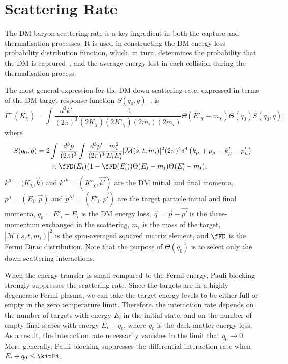 \section{Scattering Rate}
\label{sec:intratetext}
The DM-baryon scattering rate is a key ingredient in both the capture and thermalisation processes. 
It is used in constructing the DM energy loss probability distribution function, which, in turn, determines the probability that the DM is captured~\cite{Bell:2020jou_sep_ImprovedTreatmentDark}, and the average energy lost in each collision during the thermalisation process.

The most general expression for the DM down-scattering rate, expressed in terms of the DM-target response function $S(q_0,q)$~\cite{Bertoni:2013bsa_dec_DarkMatterThermalization,Bell:2020jou_sep_ImprovedTreatmentDark}, is 
\begin{equation}
\Gamma^-(K_\chi) =   \int \frac{d^3k'}{(2\pi)^3} \frac{1}{(2K_\chi)(2K'_\chi)(2m_i)(2m_i)} \Theta(E'_\chi-m_\chi)\Theta(q_0)S(q_0,q), \label{eq:intratedeftext}
\end{equation} 
where
\begin{align}
S(q_0,q)  =   2 & \int \frac{d^3p}{(2\pi)^3}\int \frac{d^3p'}{(2\pi)^3} \frac{m_i^2}{E_i E'_i}|\overline{\mathcal{M}}(s,t,m_i)|^2 
(2\pi)^4\delta^4\left(k_\mu+p_\mu-k'_\mu-p'_\mu\right)\nonumber\\
 &\times\fFD(E_i)(1-\fFD(E'_i)) \Theta(E_i-m_i)\Theta(E'_i-m_i),
 \label{eq:responsefunc}
\end{align}
$k^\mu=(K_\chi$,$\vec{k})$ and $k'^{\mu}=(K'_\chi,\vec{k'})$ are the DM initial and final momenta,  $p^\mu=(E_i,\vec{p})$ and $p'^{\mu}=(E'_i,\vec{p'})$ are the target particle initial and final momenta, $q_0=E'_i-E_i$ is the DM energy loss, $\vec{q}=\vec{p}-\vec{p'}$ is the three-momentum exchanged in the scattering, $m_i$  is the mass of the target, $|\overline{\mathcal{M}}(s,t,m_i)|^2$ is the  spin-averaged squared matrix element, and $\fFD$ is the Fermi Dirac distribution. Note that the purpose of $\Theta(q_0)$ is to select only the down-scattering interactions.


When the energy transfer is small compared to the Fermi energy, Pauli blocking strongly suppresses the scattering rate.  Since the targets are in a highly degenerate Fermi plasma, we can take the target energy levels to be either full or empty in the zero temperature limit. Therefore, the interaction rate depends on the number of targets with energy $E_i$ in the initial state, and on the number of empty final states with energy $E_i+q_0$, where $q_0$ is the dark matter energy loss. As a result, the interaction rate necessarily vanishes in the limit that  $q_0\rightarrow 0$.  More generally,  Pauli blocking suppresses the differential interaction rate when $E_i+q_0\le \kinFi$. 



